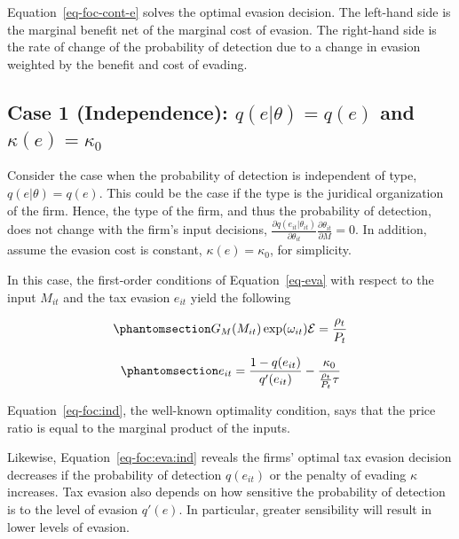 \documentclass[
  12pt]{article}
\theoremstyle{definition}
\theoremstyle{remark}
\begin{document}
Equation~\ref{eq-foc-cont-e} solves the optimal evasion decision. The
left-hand side is the marginal benefit net of the marginal cost of
evasion. The right-hand side is the rate of change of the probability of
detection due to a change in evasion weighted by the benefit and cost of
evading.

\subsection{\texorpdfstring{Case 1 (Independence): \(q(e|\theta)=q(e)\)
and
\(\kappa(e)=\kappa_0\)}{Case 1 (Independence): q(e\textbar\textbackslash theta)=q(e) and \textbackslash kappa(e)=\textbackslash kappa\_0}}\label{case-1-independence-qethetaqe-and-kappaekappa_0}

Consider the case when the probability of detection is independent of
type, \(q(e|\theta)=q(e)\). This could be the case if the type is the
juridical organization of the firm. Hence, the type of the firm, and
thus the probability of detection, does not change with the firm's input
decisions,
\(\frac{\partial q(e_{it}|\theta_{it})}{\partial \theta_{it}}\frac{\partial \theta_{it}}{\partial M}=0\).
In addition, assume the evasion cost is constant,
\(\kappa(e)=\kappa_0\), for simplicity.

In this case, the first-order conditions of Equation~\ref{eq-eva} with
respect to the input \(M_{it}\) and the tax evasion \(e_{it}\) yield the
following

\begin{equation}\phantomsection\label{eq-foc:ind}{
G_M(M_{it})\exp(\omega_{it})\mathcal{E}=\frac{\rho_{t}}{P_t}
}\end{equation}

\begin{equation}\phantomsection\label{eq-foc:eva:ind}{
e_{it}=\frac{1-q(e_{it})}{q'(e_{it})}-\frac{\kappa_0}{\frac{\rho_{t}}{P_t}\tau}
}\end{equation}

Equation~\ref{eq-foc:ind}, the well-known optimality condition, says
that the price ratio is equal to the marginal product of the inputs.

Likewise, Equation~\ref{eq-foc:eva:ind} reveals the firms' optimal tax
evasion decision decreases if the probability of detection \(q(e_{it})\)
or the penalty of evading \(\kappa\) increases. Tax evasion also depends
on how sensitive the probability of detection is to the level of evasion
\(q'(e)\). In particular, greater sensibility will result in lower
levels of evasion.
\end{document}
